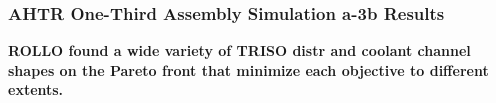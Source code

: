 \begin{frame}
    \frametitle{AHTR One-Third Assembly Simulation a-3b Results}
    \textbf{ROLLO found a wide variety of TRISO distr and coolant 
    channel shapes on the Pareto front that minimize each objective to different 
    extents.}

    \vspace{0.2cm}
    \begin{figure}
    \end{figure}
\end{frame}

